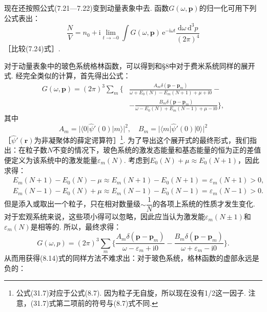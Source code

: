 现在还按照公式(7.21—7.22)变到动量表象中去. 函数$G(\omega,\bm{p})$的归一化可用下列公式表出：
\begin{equation}
\frac{N}{V}=n_{0}+\mathrm{i}\lim_{t\to-0}\int G(\omega,\bm{p})\,\mathrm{e}^{-\mathrm{i}\omega t}\frac{\mathrm{d}\omega\,\mathrm{d}^{3}p}{(2\pi)^{4}}
\label{31.6}
\end{equation}
［比较(7.24)式］.

对于动量表象中的玻色系统格林函数，可以得到和§8中对于费米系统同样的展开式. 经完全类似的计算，首先得出公式：
\begin{equation}
\begin{aligned}
G(\omega,\bm{p})=(2\pi)^{3}\sum_{m}\Big\{
&\frac{A_{m}\delta(\bm{p}-\bm{p}_{m})}{\omega+E_{0}(N)-E_{m}(N+1)+\mu+\mathrm{i}0}-{}\\
&-\frac{B_{m}\delta(\bm{p}-\bm{p}_{m})}{\omega-E_{0}(N)+E_{m}(N-1)+\mu-\mathrm{i}0}\Big\},
\end{aligned}
\label{31.7}
\end{equation}
其中
\begin{equation*}
A_{m}=|\langle0|\hat{\psi}'(0)|m\rangle|^{2},\quad
B_{m}=|\langle m|\hat{\psi}'(0)|0\rangle|^{2}
\end{equation*}
［$\hat{\psi}'(\bm{r})$为非凝聚体的薛定谔算符］\footnote{公式(31.7)对应于公式(8.7). 因为粒子无自旋，所以现在没有1/2这一因子. 注意，(31.7)式第二项前的符号与(8.7)式不同.}. 为了导出这个展开式的最终形式，我们指出：在粒子数$N$不变的情况下，玻色系统的激发态能量和基态能量的恒为正的差值便定义为该系统中的激发能量$\varepsilon_{m}(N)$. 考虑到$E_{0}(N)+\mu\approx E_{0}(N+1)$，因此求得：
\begin{equation*}
\begin{aligned}
&E_{m}(N+1)-E_{0}(N)-\mu\approx E_{m}(N+1)-E_{0}(N+1)=\varepsilon_{m}(N+1)>0,\\
&E_{m}(N-1)-E_{0}(N)+\mu\approx E_{m}(N-1)-E_{0}(N-1)=\varepsilon_{m}(N-1)>0.
\end{aligned}
\end{equation*}
但是添入或取出一个粒子，只在相对数量级$\sim\dfrac{1}{N}$的各项上系统的性质才发生变化. 对于宏观系统来说，这些项小得可以忽略，因此应当认为激发能$\varepsilon_{m}(N\pm1)$和$\varepsilon_{m}(N)$是相等的. 所以，最终求得：
\begin{equation}
G(\omega,p)=(2\pi)^{3}\sum_{m}\Big\{
\frac{A_{m}\delta(\bm{p}-\bm{p}_{m})}{\omega-\varepsilon_{m}+\mathrm{i}0}
-\frac{B_{m}\delta(\bm{p}-\bm{p}_{m})}{\omega+\varepsilon_{m}-\mathrm{i}0}\Big\}.
\label{31.8}
\end{equation}
从而用获得(8.14)式的同样方法不难求出：对于玻色系统，格林函数的虚部永远是负的：
